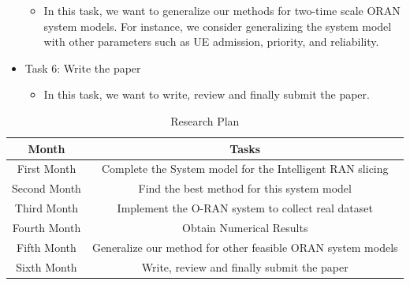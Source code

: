 \documentclass{article}
\begin{document}
\begin{itemize}
\begin{itemize}
\color{darkgray}
\item In this task, we want to generalize our methods for two-time scale ORAN system models.  For instance, we consider generalizing the system model with other parameters such as UE admission, priority, and reliability.  
\end{itemize}
\item Task 6: Write the paper
\begin{itemize}
\color{darkgray}
\item In this task, we want to write, review and finally submit the paper.
\end{itemize}
\end{itemize}

\begin{table}
 \caption {Research Plan} \label{table:1a}
 \begin{center}
  \begin{tabular}{||c c ||}
  \hline
Month & Tasks \\ [0.5ex]
  \hline\hline
  First Month & Complete the System model for the Intelligent RAN slicing\\
  \hline
  Second Month & Find the best method for this system model \\
  \hline
  Third Month & Implement the O-RAN system to collect real dataset  \\
  \hline
    Fourth Month & Obtain Numerical Results\\
  \hline
    Fifth Month & Generalize our method for other feasible ORAN system models\\
  \hline
      Sixth Month & Write, review and finally submit the paper\\
  \hline
 \end{tabular}
 \end{center}
 \end{table}

 




\vspace{20mm}
\end{document}
